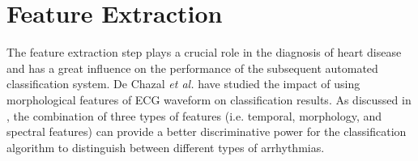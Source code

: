 
\section{Feature Extraction}

The feature extraction step plays a crucial role in the diagnosis of heart disease and has a great influence on the performance of the subsequent automated classification system. De Chazal \textit{et al.} have studied the impact of using morphological features of ECG waveform on classification results\cite{autofs}. As discussed in \cite{jambukia2015classification}, the combination of three types of features (i.e. temporal, morphology, and spectral features) can provide a better discriminative power for the classification algorithm to distinguish between different types of arrhythmias. 

